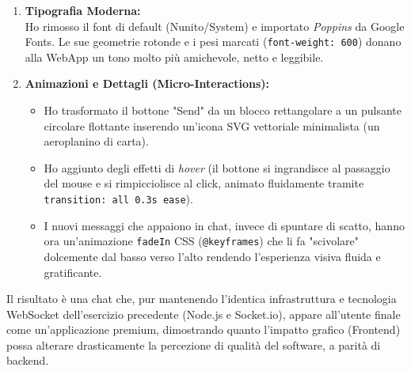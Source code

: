 \documentclass[11pt]{article}
\begin{document}
\begin{tcolorbox}[colback=green!5!white,colframe=green!75!black,title=\textbf{RISPOSTA}, breakable]
\begin{enumerate}
    \item \textbf{Tipografia Moderna:}\\
    Ho rimosso il font di default (Nunito/System) e importato \textit{Poppins} da Google Fonts. Le sue geometrie rotonde e i pesi marcati (\texttt{font-weight: 600}) donano alla WebApp un tono molto più amichevole, netto e leggibile.

    \item \textbf{Animazioni e Dettagli (Micro-Interactions):}
    \begin{itemize}
        \item Ho trasformato il bottone "Send" da un blocco rettangolare a un pulsante circolare flottante inserendo un'icona SVG vettoriale minimalista (un aeroplanino di carta).
        \item Ho aggiunto degli effetti di \textit{hover} (il bottone si ingrandisce al passaggio del mouse e si rimpicciolisce al click, animato fluidamente tramite \texttt{transition: all 0.3s ease}).
        \item I nuovi messaggi che appaiono in chat, invece di spuntare di scatto, hanno ora un'animazione \texttt{fadeIn} CSS (\texttt{@keyframes}) che li fa "scivolare" dolcemente dal basso verso l'alto rendendo l'esperienza visiva fluida e gratificante.
    \end{itemize}
\end{enumerate}

Il risultato è una chat che, pur mantenendo l'identica infrastruttura e tecnologia WebSocket dell'esercizio precedente (Node.js e Socket.io), appare all'utente finale come un'applicazione premium, dimostrando quanto l'impatto grafico (Frontend) possa alterare drasticamente la percezione di qualità del software, a parità di backend.
\end{tcolorbox}
\end{document}
